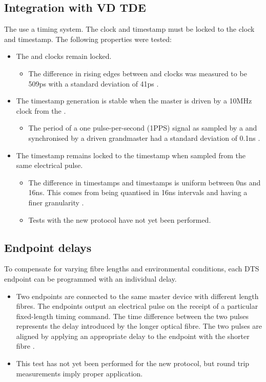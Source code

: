 \documentclass{dune}
\begin{document}
\subsection{Integration with VD TDE}
The   use a  timing system.
The  clock and timestamp must be locked to the  clock and timestamp.
The following properties were tested:
\begin{itemize}
  \item The  and  clocks remain locked.
  \begin{itemize}
    \item The difference in rising edges between  and  clocks was measured to be 509ps with a standard deviation of 41ps \cite{wr}.
  \end{itemize}
  \item The  timestamp generation is stable when the  master is driven by a 10MHz clock from the .
  \begin{itemize}
    \item The period of a one pulse-per-second (1PPS) signal as sampled by a   and synchronised by a  driven  grandmaster had a standard deviation of 0.1ns \cite{wr}.
  \end{itemize}
  \item The  timestamp remains locked to the  timestamp when sampled from the same electrical pulse.
  \begin{itemize}
    \item The difference in  timestamps and  timestamps is uniform between 0ns and 16ns. This comes from  being quantised in 16ns intervals and  having a finer granularity \cite{wr}.
    \item Tests with the new protocol have not yet been performed.
  \end{itemize}
\end{itemize}

\subsection{Endpoint delays}
To compensate for varying fibre lengths and environmental conditions, each DTS endpoint can be programmed with an individual delay.
\begin{itemize}
  \item Two endpoints are connected to the same master device with different length fibres.
  The endpoints output an electrical pulse on the receipt of a particular fixed-length timing command.
  The time difference between the two pulses represents the delay introduced by the longer optical fibre.
  The two pulses are aligned by applying an appropriate delay to the endpoint with the shorter fibre \cite{delays}.
  \item This test has not yet been performed for the new protocol, but round trip measurements imply proper application.
\end{itemize}
\end{document}
